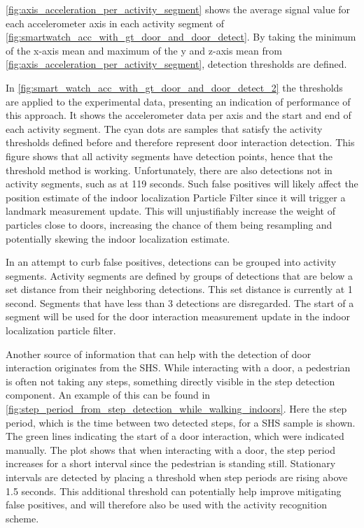 \cref{fig:axis_acceleration_per_activity_segment} shows the average signal value for each accelerometer axis in each activity segment of \cref{fig:smartwatch_acc_with_gt_door_and_door_detect}. By taking the minimum of the x-axis mean and maximum of the y and z-axis mean from \cref{fig:axis_acceleration_per_activity_segment}, detection thresholds are defined.

In \cref{fig:smart_watch_acc_with_gt_door_and_door_detect_2} the thresholds are applied to the experimental data, presenting an indication of performance of this approach. It shows the accelerometer data per axis and the start and end of each activity segment. The cyan dots are samples that satisfy the activity thresholds defined before and therefore represent door interaction detection. This figure shows that all activity segments have detection points, hence that the threshold method is working. Unfortunately, there are also detections not in activity segments, such as at 119 seconds. Such false positives will likely affect the position estimate of the indoor localization Particle Filter since it will trigger a landmark measurement update. This will unjustifiably increase the weight of particles close to doors, increasing the chance of them being resampling and potentially skewing the indoor localization estimate.  \par 

In an attempt to curb false positives, detections can be grouped into activity segments. Activity segments are defined by groups of detections that are below a set distance from their neighboring detections. This set distance is currently at 1 second. Segments that have less than 3 detections are disregarded. The start of a segment will be used for the door interaction measurement update in the indoor localization particle filter.\par

Another source of information that can help with the detection of door interaction originates from the \ac{SHS}. While interacting with a door, a pedestrian is often not taking any steps, something directly visible in the step detection component. An example of this can be found in \cref{fig:step_period_from_step_detection_while_walking_indoors}. Here the step period, which is the time between two detected steps, for a \ac{SHS} sample is shown. The green lines indicating the start of a door interaction, which were indicated manually. The plot shows that when interacting with a door, the step period increases for a short interval since the pedestrian is standing still. Stationary intervals are detected by placing a threshold when step periods are rising above 1.5 seconds. This additional threshold can potentially help improve mitigating false positives, and will therefore also be used with the activity recognition scheme.

